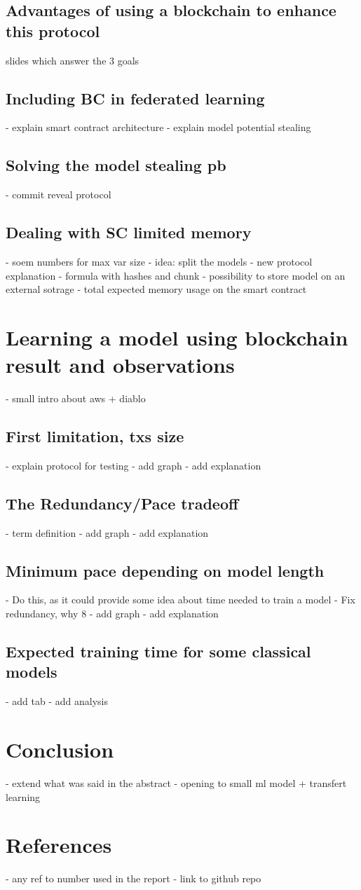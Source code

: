 \documentclass{article}
\begin{document}
\subsection{Advantages of using a blockchain to enhance this protocol}
slides which answer the 3 goals
\subsection{Including BC in federated learning}
- explain smart contract architecture
- explain model potential stealing
\subsection{Solving the model stealing pb}
- commit reveal protocol
\subsection{Dealing with SC limited memory}
- soem numbers for max var size
- idea: split the models
- new protocol explanation
- formula with hashes and chunk
- possibility to store model on an external sotrage
- total expected memory usage on the smart contract
\section{Learning a model using blockchain result and observations}
- small intro about aws + diablo
\subsection{First limitation, txs size}
- explain protocol for testing
- add graph
- add explanation
\subsection{The Redundancy/Pace tradeoff}
- term definition
- add graph
- add explanation
\subsection{Minimum pace depending on model length}
- Do this, as it could provide some idea about time needed to train a model
- Fix redundancy, why 8
- add graph
- add explanation
\subsection{Expected training time for some classical models}
- add tab
- add analysis
\section{Conclusion}
- extend what was said in the abstract
- opening to small ml model + transfert learning
\section{References}
- any ref to number used in the report
- link to github repo
\end{document}
